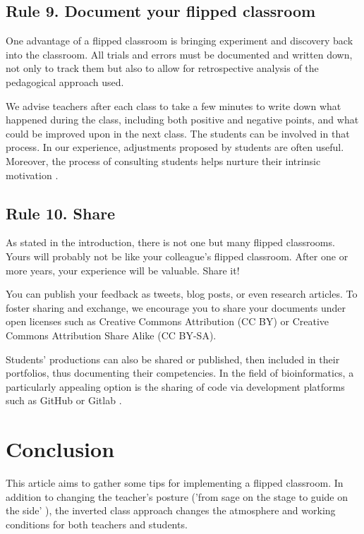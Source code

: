 \documentclass[10pt,letterpaper]{article}
\begin{document}
\subsection{Rule 9. Document your flipped classroom}

One advantage of a flipped classroom is bringing experiment and discovery back into the classroom. All trials and errors 
must be documented and written down, not only to track them but also to allow for retrospective analysis of the pedagogical approach used.

We advise teachers after each class to take a few minutes to write down what happened during the class, including both positive and negative points, 
and what could be improved upon in the next class. The students can be involved in that process. 
In our experience, adjustments proposed by students are often useful. Moreover, the process of consulting students helps nurture their intrinsic motivation \cite{oraif_university_2018,thai_impact_2017}.


\subsection{Rule 10. Share}

As stated in the introduction, there is not one but many flipped classrooms. Yours will probably not be like your colleague's flipped
classroom. After one or more years, your experience will be valuable. Share it!

You can publish your feedback as tweets, blog posts, or even research articles. To foster sharing and exchange, 
we encourage you to share your documents under open licenses such as Creative Commons Attribution (CC BY) or Creative Commons Attribution Share Alike (CC BY-SA).

Students’ productions can also be shared or published, then included in their portfolios, thus documenting their competencies. 
In the field of bioinformatics, a particularly appealing option is the sharing of code via development platforms such as GitHub or Gitlab \cite{blischak_quick_2016,abdollahi2018meet}.


\section*{Conclusion}

This article aims to gather some tips for implementing a flipped classroom. In addition to changing 
the teacher's posture ('from sage on the stage to guide on the side' \cite{king_sage_1993}), 
the inverted class approach changes the atmosphere and working conditions for both teachers 
and students.
\end{document}
